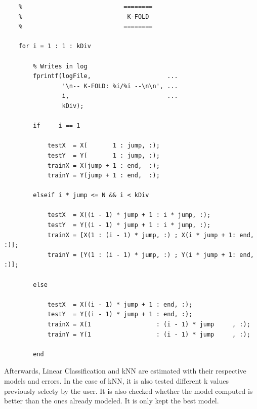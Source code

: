 \documentclass[11pt]{article}
\begin{document}
\begin{verbatim}
    %                            ========
    %                             K-FOLD
    %                            ========
    
    for i = 1 : 1 : kDiv
        
        % Writes in log
        fprintf(logFile,                     ...
                '\n-- K-FOLD: %i/%i --\n\n', ...
                i,                           ...
                kDiv);
        
        if     i == 1
            
            testX  = X(       1 : jump, :);
            testY  = Y(       1 : jump, :);
            trainX = X(jump + 1 : end,  :);
            trainY = Y(jump + 1 : end,  :);
            
        elseif i * jump <= N && i < kDiv 
            
            testX  = X((i - 1) * jump + 1 : i * jump, :);
            testY  = Y((i - 1) * jump + 1 : i * jump, :);
            trainX = [X(1 : (i - 1) * jump, :) ; X(i * jump + 1: end, :)];
            trainY = [Y(1 : (i - 1) * jump, :) ; Y(i * jump + 1: end, :)];
            
        else
            
            testX  = X((i - 1) * jump + 1 : end, :);
            testY  = Y((i - 1) * jump + 1 : end, :);
            trainX = X(1                  : (i - 1) * jump     , :);
            trainY = Y(1                  : (i - 1) * jump     , :);
            
        end
\end{verbatim}

Afterwards, Linear Classification and kNN are estimated with their respective
models and errors. In the case of kNN, it is also tested different k values
previously selecty by the user. 
It is also checked whether the model computed is better than the ones already
modeled. It is only kept the best model.
\end{document}
